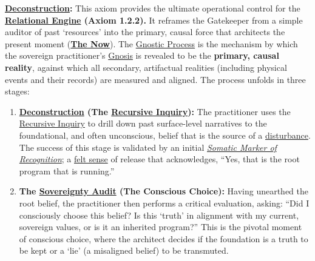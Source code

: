 \documentclass{article}
\begin{document}
\begin{nobullet}
    \item \textbf{\hyperlink{gloss:deconstruction}{Deconstruction}:} This axiom provides the ultimate operational control for the \textbf{\hyperlink{gloss:relational_engine}{Relational Engine} (Axiom 1.2.2).} It reframes the Gatekeeper from a simple auditor of past `resources' into the primary, causal force that architects the present moment (\textbf{\hyperlink{gloss:the_now}{The Now}}). The \hyperlink{gloss:gnostic_process}{Gnostic Process} is the mechanism by which the sovereign practitioner's \hyperlink{gloss:gnosis}{Gnosis} is revealed to be the \textbf{primary, causal reality}, against which all secondary, artifactual realities (including physical events and their records) are measured and aligned. The process unfolds in three stages:
    \begin{enumerate}
        \item \textbf{\hyperlink{gloss:deconstruction}{Deconstruction} (The \hyperlink{gloss:recursive_inquiry}{Recursive Inquiry}):} The practitioner uses the \hyperlink{gloss:recursive_inquiry}{Recursive Inquiry} to drill down past surface-level narratives to the foundational, and often unconscious, belief that is the source of a \hyperlink{gloss:disturbance}{disturbance}. The success of this stage is validated by an initial \textit{\hyperlink{gloss:somatic_marker_of_recognition}{Somatic Marker of Recognition}}; a \hyperlink{gloss:felt_sense}{felt sense} of release that acknowledges, ``Yes, that is the root program that is running.''
        
        \item \textbf{The \hyperlink{gloss:sovereignty_audit}{Sovereignty Audit} (The Conscious Choice):} Having unearthed the root belief, the practitioner then performs a critical evaluation, asking: ``Did I consciously choose this belief? Is this `truth' in alignment with my current, sovereign values, or is it an inherited program?'' This is the pivotal moment of conscious choice, where the architect decides if the foundation is a truth to be kept or a `lie' (a misaligned belief) to be transmuted.
        

\end{enumerate}
\end{nobullet}
\end{document}
